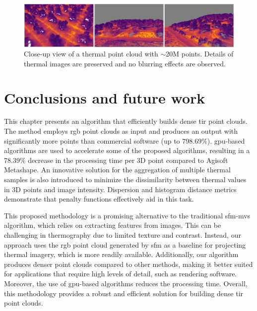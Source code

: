 \begin{figure}[hbt]
	\centering
    \includegraphics[width=\linewidth]{figs/thermal_projection/thermal_close_view.png}
	\caption{Close-up view of a thermal point cloud with $\sim$20M points. Details of thermal images are preserved and no blurring effects are observed.}
	\label{fig:thermal_zoomed_up}
\end{figure}

\section{Conclusions and future work}

This chapter presents an algorithm that efficiently builds dense \acrshort{tir} point clouds. The method employs \acrshort{rgb} point clouds as input and produces an output with significantly more points than commercial software (up to 798.69\%). \acrshort{gpu}-based algorithms are used to accelerate some of the proposed algorithms, resulting in a 78.39\% decrease in the processing time per 3D point compared to Agisoft Metashape. An innovative solution for the aggregation of multiple thermal samples is also introduced to minimize the dissimilarity between thermal values in 3D points and image intensity. Dispersion and histogram distance metrics demonstrate that penalty functions effectively aid in this task.

This proposed methodology is a promising alternative to the traditional \acrshort{sfm}-\acrshort{mvs} algorithm, which relies on extracting features from images. This can be challenging in thermography due to limited texture and contrast. Instead, our approach uses the \acrshort{rgb} point cloud generated by \acrshort{sfm} as a baseline for projecting thermal imagery, which is more readily available. Additionally, our algorithm produces denser point clouds compared to other methods, making it better suited for applications that require high levels of detail, such as rendering software. Moreover, the use of \acrshort{gpu}-based algorithms reduces the processing time. Overall, this methodology provides a robust and efficient solution for building dense \acrshort{tir} point clouds.

